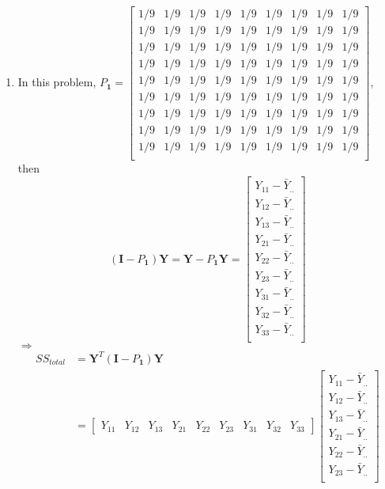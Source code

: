 \documentclass{article}
\begin{document}
\begin{enumerate}[leftmargin = 0 em, label = \arabic*., font = \bfseries]
	\item 
	In this problem, $P_{\bm 1} = \begin{bmatrix}
		1/9 & 1/9 & 1/9 & 1/9 & 1/9 & 1/9 & 1/9 & 1/9 & 1/9 \\
		1/9 & 1/9 & 1/9 & 1/9 & 1/9 & 1/9 & 1/9 & 1/9 & 1/9 \\
		1/9 & 1/9 & 1/9 & 1/9 & 1/9 & 1/9 & 1/9 & 1/9 & 1/9 \\
		1/9 & 1/9 & 1/9 & 1/9 & 1/9 & 1/9 & 1/9 & 1/9 & 1/9 \\
		1/9 & 1/9 & 1/9 & 1/9 & 1/9 & 1/9 & 1/9 & 1/9 & 1/9 \\
		1/9 & 1/9 & 1/9 & 1/9 & 1/9 & 1/9 & 1/9 & 1/9 & 1/9 \\
		1/9 & 1/9 & 1/9 & 1/9 & 1/9 & 1/9 & 1/9 & 1/9 & 1/9 \\
		1/9 & 1/9 & 1/9 & 1/9 & 1/9 & 1/9 & 1/9 & 1/9 & 1/9 \\
		1/9 & 1/9 & 1/9 & 1/9 & 1/9 & 1/9 & 1/9 & 1/9 & 1/9 \\
	\end{bmatrix}$, then
	\[(\bm I - P_{\bm 1})\bm Y = \bm Y - P_{\bm 1}\bm Y = \begin{bmatrix}
		Y_{11} - \bar{Y}_{..}\\
		Y_{12} - \bar{Y}_{..}\\
		Y_{13} - \bar{Y}_{..}\\
		Y_{21} - \bar{Y}_{..}\\
		Y_{22} - \bar{Y}_{..}\\
		Y_{23} - \bar{Y}_{..}\\
		Y_{31} - \bar{Y}_{..}\\
		Y_{32} - \bar{Y}_{..}\\
		Y_{33} - \bar{Y}_{..}\\
	\end{bmatrix}\]
	$\Rightarrow$
	\begin{align*}
	SS_{total} &= \bm Y^T (\bm I - P_{\bm 1})\bm Y\\
	& = \begin{bmatrix}
		Y_{11} & Y_{12} & Y_{13} & Y_{21} & Y_{22} & Y_{23} & Y_{31} & Y_{32} & Y_{33}
	\end{bmatrix}
	 \begin{bmatrix}
		Y_{11} - \bar{Y}_{..}\\
		Y_{12} - \bar{Y}_{..}\\
		Y_{13} - \bar{Y}_{..}\\
		Y_{21} - \bar{Y}_{..}\\
		Y_{22} - \bar{Y}_{..}\\
		Y_{23} - \bar{Y}_{..}\\

\end{bmatrix}
\end{align*}
\end{enumerate}
\end{document}
